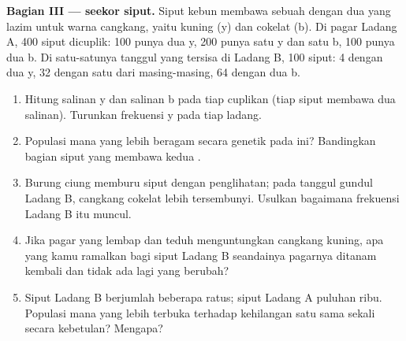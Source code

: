 \begin{problem}
\medskip
\noindent\textbf{Bagian III ---  seekor siput.}
Siput kebun membawa sebuah  dengan dua  yang lazim untuk warna
cangkang, yaitu kuning (y) dan cokelat (b). Di pagar Ladang A, 400
siput dicuplik: 100 punya dua  y, 200 punya satu y dan satu b, 100
punya dua b. Di satu-satunya tanggul yang tersisa di Ladang B, 100
siput: 4 dengan dua y, 32 dengan satu dari masing-masing, 64 dengan dua b.
\begin{enumerate}[resume]
  \item Hitung salinan y dan salinan b pada tiap cuplikan (tiap siput
        membawa dua salinan). Turunkan frekuensi y pada tiap ladang.
  \item Populasi mana yang lebih beragam secara genetik pada  ini?
        Bandingkan bagian siput yang membawa kedua .
  \item Burung ciung memburu siput dengan penglihatan; pada tanggul
        gundul Ladang B, cangkang cokelat lebih tersembunyi. Usulkan
        bagaimana frekuensi Ladang B itu muncul.
  \item Jika pagar yang lembap dan teduh menguntungkan cangkang kuning,
        apa yang kamu ramalkan bagi siput Ladang B seandainya pagarnya
        ditanam kembali dan tidak ada lagi yang berubah?
  \item Siput Ladang B berjumlah beberapa ratus; siput Ladang A puluhan
        ribu. Populasi mana yang lebih terbuka terhadap kehilangan satu
         sama sekali secara kebetulan? Mengapa?
\end{enumerate}


\end{problem}
